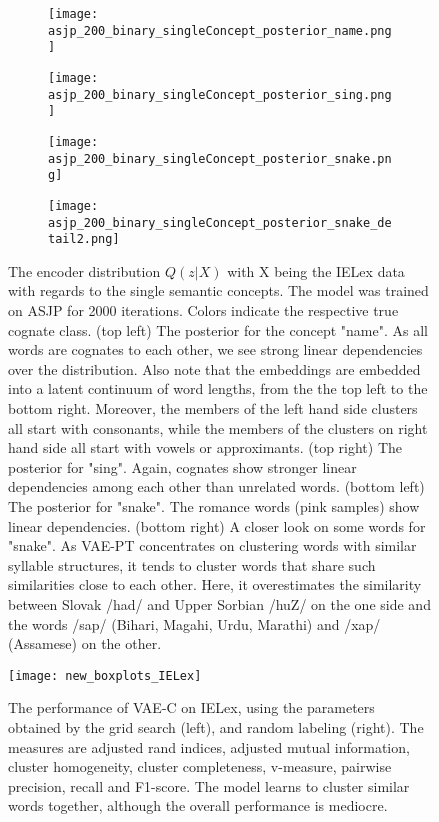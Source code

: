 \documentclass[6pt]{article}
\begin{document}
 \begin{figure}[h!] 
  \begin{subfigure}[b]{0.5\linewidth}
    \centering
    \texttt{[image: asjp\_200\_binary\_singleConcept\_posterior\_name.png]} 
    \label{fig:vae_phono_orthofeatures0} 
    \vspace{4ex}
  \end{subfigure}%
  \begin{subfigure}[b]{0.5\linewidth}
    \centering
    \texttt{[image: asjp\_200\_binary\_singleConcept\_posterior\_sing.png]} 
    \label{fig:vae_phono_orthofeatures1} 
    \vspace{4ex}
  \end{subfigure} 
  \begin{subfigure}[b]{0.5\linewidth}
    \centering
    \texttt{[image: asjp\_200\_binary\_singleConcept\_posterior\_snake.png]} 
    \label{fig:vae_phono_orthofeatures2} 
  \end{subfigure}%
  \begin{subfigure}[b]{0.5\linewidth}
    \centering
    \texttt{[image: asjp\_200\_binary\_singleConcept\_posterior\_snake\_detail2.png]} 
    \label{fig:vae_phono_orthofeatures3} 
  \end{subfigure} 
  \caption{The encoder distribution $Q(z|X)$ with X being the IELex data with regards to the single semantic concepts. The model was trained on ASJP for 2000 iterations. Colors indicate the respective true cognate class. (top left) The posterior for the concept "name". As all words are cognates to each other, we see strong linear dependencies over the distribution. Also note that the embeddings are embedded into a latent continuum of word lengths, from the the top left to the bottom right. Moreover, the members of the left hand side clusters all start with consonants, while the members of the clusters on right hand side all start with vowels or approximants. (top right) The posterior for "sing". Again, cognates show stronger linear dependencies among each other than unrelated words. (bottom left) The posterior for "snake". The romance words (pink samples) show linear dependencies. (bottom right) A closer look on some words for "snake". As VAE-PT concentrates on clustering words with similar syllable structures, it tends to cluster words that share such similarities close to each other. Here, it overestimates the similarity between Slovak /had/ and Upper Sorbian /huZ/ on the one side and the words /sap/ (Bihari, Magahi, Urdu, Marathi) and /xap/ (Assamese) on the other.  }
  \label{fig:asjp_2000_binary_singleIELEXConcepts_posteriors} 
\end{figure}


 \begin{figure}[h!] 
     \texttt{[image: new\_boxplots\_IELex]} 
     \caption{The performance of VAE-C on IELex, using the parameters obtained by the grid search (left), and random labeling (right). The measures are adjusted rand indices, adjusted mutual information, cluster homogeneity, cluster completeness, v-measure, pairwise precision, recall and F1-score. The model learns to cluster similar words together, although the overall performance is mediocre.}
    \label{fig:boxplots_IELex} 
\end{figure}
\end{document}
